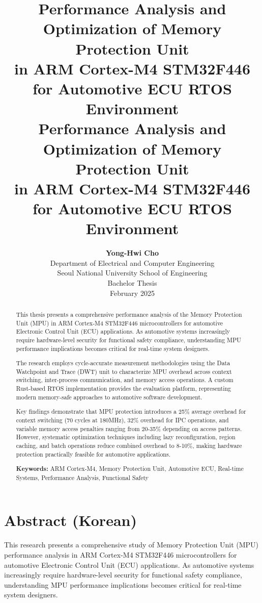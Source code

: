 \documentclass[12pt,a4paper,oneside]{report}
\title{
    \textbf{Performance Analysis and Optimization of Memory Protection Unit\\
    in ARM Cortex-M4 STM32F446 for Automotive ECU RTOS Environment}\\
    \vspace{1cm}
    \large Performance Analysis and Optimization of Memory Protection Unit\\
    in ARM Cortex-M4 STM32F446 for Automotive ECU RTOS Environment
}
\author{
    \textbf{Yong-Hwi Cho}\\
    \vspace{0.5cm}
    Department of Electrical and Computer Engineering\\
    Seoul National University School of Engineering\\
    \vspace{0.5cm}
    Bachelor Thesis\\
    February 2025
}
\date{}
\begin{document}
\maketitle
\thispagestyle{empty}

\newpage
\begin{abstract}
This thesis presents a comprehensive performance analysis of the Memory Protection Unit (MPU) in ARM Cortex-M4 STM32F446 microcontrollers for automotive Electronic Control Unit (ECU) applications. As automotive systems increasingly require hardware-level security for functional safety compliance, understanding MPU performance implications becomes critical for real-time system designers.

The research employs cycle-accurate measurement methodologies using the Data Watchpoint and Trace (DWT) unit to characterize MPU overhead across context switching, inter-process communication, and memory access operations. A custom Rust-based RTOS implementation provides the evaluation platform, representing modern memory-safe approaches to automotive software development.

Key findings demonstrate that MPU protection introduces a 25\% average overhead for context switching (70 cycles at 180MHz), 32\% overhead for IPC operations, and variable memory access penalties ranging from 20-35\% depending on access patterns. However, systematic optimization techniques including lazy reconfiguration, region caching, and batch operations reduce combined overhead to 8-10\%, making hardware protection practically feasible for automotive applications.

\textbf{Keywords:} ARM Cortex-M4, Memory Protection Unit, Automotive ECU, Real-time Systems, Performance Analysis, Functional Safety
\end{abstract}

\newpage
\tableofcontents

\newpage
\listoffigures

\newpage
\listoftables

\newpage
\setcounter{page}{1}








\newpage


\newpage
\section*{Abstract (Korean)}
This research presents a comprehensive study of Memory Protection Unit (MPU) performance analysis in ARM Cortex-M4 STM32F446 microcontrollers for automotive Electronic Control Unit (ECU) applications. As automotive systems increasingly require hardware-level security for functional safety compliance, understanding MPU performance implications becomes critical for real-time system designers.
\end{document}
